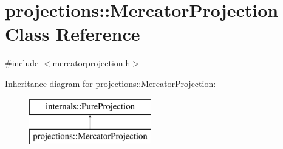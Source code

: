 \hypertarget{classprojections_1_1_mercator_projection}{\section{projections\-:\-:\-Mercator\-Projection \-Class \-Reference}
\label{classprojections_1_1_mercator_projection}
}


{\ttfamily \#include $<$mercatorprojection.\-h$>$}

\-Inheritance diagram for projections\-:\-:\-Mercator\-Projection\-:\begin{figure}[H]
\begin{center}
\leavevmode
\includegraphics[height=2.000000cm]{classprojections_1_1_mercator_projection}
\end{center}
\end{figure}
